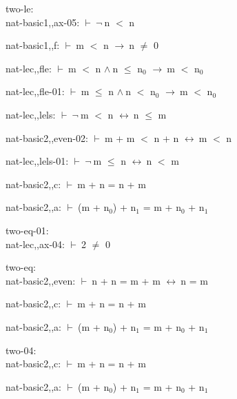 \documentclass[a4paper]{article}
\newcommand{\Fol}{\mbox{$\vdash\ $}}
\newcommand{\Not}{\mbox{$\neg\ $}}
\newcommand{\And}{\mbox{$\wedge\ $}}
\newcommand{\Imp}{\mbox{$\rightarrow\ $}}
\newcommand{\Equiv}{\mbox{$\leftrightarrow\ $}}
\begin{document}
\bigskip

two-le:\\ nat-basic1,,ax-05: 
 \Fol \Not n $<$ n



nat-basic1,,f: 
 \Fol m $<$ n \Imp n $\neq$ 0



nat-lec,,fle: 
 \Fol m $<$ n \And n $\le$ $\mbox{n}_{0}$ \Imp m $<$ $\mbox{n}_{0}$



nat-lec,,fle-01: 
 \Fol m $\le$ n \And n $<$ $\mbox{n}_{0}$ \Imp m $<$ $\mbox{n}_{0}$



nat-lec,,lels: 
 \Fol \Not m $<$ n \Equiv n $\le$ m



nat-basic2,,even-02: 
 \Fol m + m $<$ n + n \Equiv m $<$ n



nat-lec,,lels-01: 
 \Fol \Not m $\le$ n \Equiv n $<$ m



nat-basic2,,c: 
 \Fol m + n = n + m



nat-basic2,,a: 
 \Fol (m + $\mbox{n}_{0}$) + $\mbox{n}_{1}$ = m + $\mbox{n}_{0}$ + $\mbox{n}_{1}$



\bigskip

two-eq-01:\\ nat-lec,,ax-04: 
 \Fol 2 $\neq$ 0



\bigskip

two-eq:\\ nat-basic2,,even: 
 \Fol n + n = m + m \Equiv n = m



nat-basic2,,c: 
 \Fol m + n = n + m



nat-basic2,,a: 
 \Fol (m + $\mbox{n}_{0}$) + $\mbox{n}_{1}$ = m + $\mbox{n}_{0}$ + $\mbox{n}_{1}$



\bigskip

two-04:\\ nat-basic2,,c: 
 \Fol m + n = n + m



nat-basic2,,a: 
 \Fol (m + $\mbox{n}_{0}$) + $\mbox{n}_{1}$ = m + $\mbox{n}_{0}$ + $\mbox{n}_{1}$



\bigskip
\end{document}
